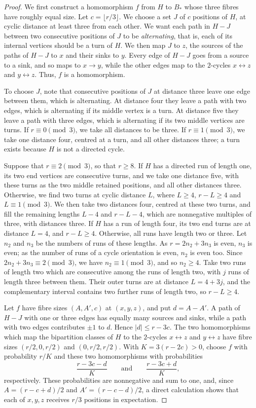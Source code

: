 \begin{proof}
We first construct a homomorphism $f$ from $H$ to $B_*$ whose three fibres have roughly equal size. Let $c=\lfloor r/3\rfloor$. We choose a set $J$ of $c$ positions of $H$, at cyclic distance at least three from each other. We want each path in $H-J$ between two consecutive positions of $J$ to be \emph{alternating}, that is, each of its internal vertices should be a turn of $H$. We then map $J$ to $z$, the sources of the paths of $H-J$ to $x$ and their sinks to $y$. Every edge of $H-J$ goes from a source to a sink, and so maps to $x\to y$, while the other edges map to the $2$-cycles $x\leftrightarrow z$ and $y\leftrightarrow z$. Thus, $f$ is a homomorphism.

To choose $J$, note that consecutive positions of $J$ at distance three leave one edge between them, which is alternating. At distance four they leave a path with two edges, which is alternating if its middle vertex is a turn. At distance five they leave a path with three edges, which is alternating if its two middle vertices are turns.
If $r\equiv0\pmod3$, we take all distances to be three.
If $r\equiv1\pmod3$, we take one distance four, centred at a turn, and all other distances three; a turn exists because $H$ is not a directed cycle.

Suppose that $r\equiv2\pmod3$, so that $r\ge8$. If $H$ has a directed run of length one, its two end vertices are consecutive turns, and we take one distance five, with these turns as the two middle retained positions, and all other distances three.
Otherwise, we find two turns at cyclic distance $L$, where $L\ge4$, $r-L\ge4$ and $L\equiv1\pmod 3$. We then take two distances four, centred at these two turns, and fill the remaining lengths $L-4$ and $r-L-4$, which are nonnegative multiples of three, with distances three. If $H$ has a run of length four, its two end turns are at distance $L=4$, and $r-L\ge4$. Otherwise, all runs have length two or three. Let $n_2$ and $n_3$ be the numbers of runs of these lengths. As $r=2n_2+3n_3$ is even, $n_3$ is even; as the number of runs of a cycle orientation is even, $n_2$ is even too. Since $2n_2+3n_3\equiv2\pmod3$, we have $n_2\equiv1\pmod3$, and so $n_2\ge4$. Take two runs of length two which are consecutive among the runs of length two, with $j$ runs of length three between them. Their outer turns are at distance $L=4+3j$, and the complementary interval contains two further runs of length two, so $r-L\ge4$.

Let $f$ have fibre sizes $(A,A',c)$ at $(x,y,z)$, and put $d=A-A'$. A path of $H-J$ with one or three edges has equally many sources and sinks, while a path with two edges contributes $\pm1$ to $d$. Hence $|d|\le r-3c$.
The two homomorphisms which map the bipartition classes of $H$ to the $2$-cycles $x\leftrightarrow z$ and $y\leftrightarrow z$ have fibre sizes $(r/2,0,r/2)$ and $(0,r/2,r/2)$. With $K=3(r-2c)>0$, choose $f$ with probability $r/K$ and these two homomorphisms with probabilities
\[
 \frac{r-3c-d}K\qquad\text{and}\qquad\frac{r-3c+d}K,
\]
respectively. These probabilities are nonnegative and sum to one, and, since $A=(r-c+d)/2$ and $A'=(r-c-d)/2$, a direct calculation shows that each of $x,y,z$ receives $r/3$ positions in expectation.


\end{proof}
